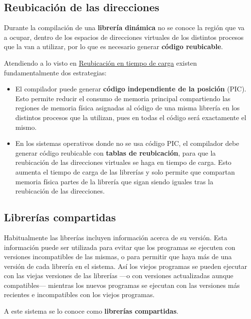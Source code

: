 \subsection{Reubicación de las
direcciones}\label{_reubicaciuxf3n_de_las_direcciones_2}

Durante la compilación de una \textbf{librería dinámica} no se conoce la
región que va a ocupar, dentro de los espacios de direcciones virtuales
de los distintos procesos que la van a utilizar, por lo que es necesario
generar \textbf{código reubicable}.

Atendiendo a lo visto en
\hyperref[_reubicaciuxf3n_en_tiempo_de_carga]{Reubicación en tiempo de
carga} existen fundamentalmente dos estrategias:

\begin{itemize}
\item
  El compilador puede generar \textbf{código independiente de la
  posición} (PIC). Esto permite reducir el consumo de memoria principal
  compartiendo las regiones de memoria física asignadas al código de una
  misma librería en los distintos procesos que la utilizan, pues en
  todas el código será exactamente el mismo.
\item
  En los sistemas operativos donde no se usa código PIC, el compilador
  debe generar código reubicable con \textbf{tablas de reubicación},
  para que la reubicación de las direcciones virtuales se haga en tiempo
  de carga. Esto aumenta el tiempo de carga de las librerías y solo
  permite que compartan memoria física partes de la librería que sigan
  siendo iguales tras la reubicación de las direcciones.
\end{itemize}

\subsection{Librerías compartidas}\label{_libreruxedas_compartidas}

{} Habitualmente las librerías incluyen información acerca de su
versión. Esta información puede ser utilizada para evitar que los
programas se ejecuten con versiones incompatibles de las mismas, o para
permitir que haya más de una versión de cada librería en el sistema. Así
los viejos programas se pueden ejecutar con las viejas versiones de las
librerías ---o con versiones actualizadas aunque compatibles--- mientras
los nuevos programas se ejecutan con las versiones más recientes e
incompatibles con los viejos programas.

A este sistema se lo conoce como \textbf{librerías compartidas}.

